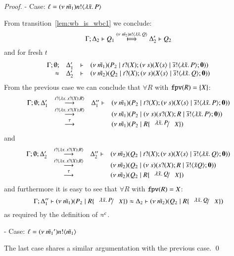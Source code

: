 \begin{proof}
	\noi - Case: $\ell = (\nu\ \tilde{m_1}) n ! \langle \lambda \tilde{x}.\,P \rangle$

	\noi From transition~\ref{lem:wb_is_wbc1} we conclude:
%
\[
	\horel{\Gamma}{\Delta_2}{Q_1}{\Hby{\news{\tilde{m_2}} \bactout{n}{\abs{\tilde{x}}{Q}}}}{\Delta_2'}{Q_2}
\]
%
	\noi and for fresh $t$
%
\[
	\begin{array}{rcll} \Gamma; \emptyset; &\Delta_1'& \vdash& (\nu\ \tilde{m_1})(P_2 \;|\; t ? (X) ; (\nu\ s)(X\langle s \rangle \;|\; \overline{s} ! \langle \lambda \tilde{x}.\,P \rangle ; \mathbf{0}))\\ \approx &\Delta_2'& \vdash &  (\nu\ \tilde{m_2})(Q_2 \;|\; t ? (X) ; (\nu\ s)(X\langle s \rangle \;|\; \overline{s} ! \langle \lambda \tilde{x}.\,Q \rangle ; \mathbf{0})) \end{array}
\]
%
	\noi From the  previous case we can conclude that $\forall R$ with $\mathtt{fpv}(R) = \{X\}$:
%
\[
	\begin{array}{rcll}
		\Gamma; \es; \Delta_1' &\by{\bactinp{t}{\abs{x}{\binp{x}{X} R}}}& \Delta_1'' \proves& \newsp{\tilde{m_1}}{P_2 \Par \binp{t}{X} \newsp{s}{\appl{X}{s} \Par \bout{\dual{s}}{\abs{\tilde{x}}{P}} \inact}} \\
		&\by{\bactinp{t}{\abs{x}{\binp{x}{X} R}}}& &\newsp{\tilde{m_1}}{P_2 \Par \newsp{s}{\binp{s}{X} R \Par \bout{\dual{s}}{\abs{\tilde{x}}{P}} \inact}}\\
		&\by{\tau}&& \newsp{\tilde{m_1}}{P_2 \Par  R \subst{\abs{\tilde{x}}{P}}{X}}
	\end{array}
\]
%
	\noi and
%
\[
	\begin{array}{rcll}
		\Gamma; \es; \Delta_2' &\by{\bactinp{t}{\abs{x}{\binp{x}{X} R}}}& \Delta_2'' \proves& \newsp{\tilde{m_2}}{Q_2 \Par \binp{t}{X} \newsp{s}{\appl{X}{s} \Par \bout{\dual{s}}{\abs{\tilde{x}}{Q}} \inact}} \\
		 &\by{\bactinp{t}{\abs{x}{\binp{x}{X} R}}}& &\newsp{\tilde{m_2}}{Q_2 \Par \newsp{s}{\binp{s}{X} R \Par \bout{\dual{s}}{{\tilde{x}}{Q}} \inact}}\\
		&\by{\tau}&& \newsp{\tilde{m_2}}{Q_2 \Par  R \subst{\abs{\tilde{x}}{Q}}{X}}
	\end{array}
\]
%
	\noi and furthermore it is easy to see that $\forall R$ with $\mathtt{fpv}(R) = X$:
%
\[
	\horel{\Gamma}{\Delta_1''}{\newsp{\tilde{m_1}}{P_2 \Par  R \subst{\abs{\tilde{x}}{P}}{X}}}{\wb}{\Delta_2}{\newsp{\tilde{m_2}}{Q_2 \Par R \subst{\abs{\tilde{x}}{Q}}{X}}}
\]
%
	\noi as required by the definition of $\approx^{c}$.

	\noi - Case: $\ell = (\nu\ \tilde{m_1}') n ! \langle \tilde{m_1} \rangle$

	The last case shares a similar argumentation with the previous case.
	\qed
\end{proof}



